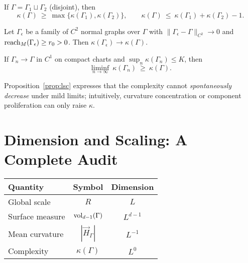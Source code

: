\begin{proposition}
\label{prop:mono}
If $\Gamma=\Gamma_1\sqcup\Gamma_2$ (disjoint), then
\[
\kappa(\Gamma)\ \ge\ \max\{\kappa(\Gamma_1),\kappa(\Gamma_2)\},\qquad
\kappa(\Gamma)\ \le\ \kappa(\Gamma_1)+\kappa(\Gamma_2)-1.
\]
\end{proposition}

\begin{proposition}
\label{prop:stability}
Let $\Gamma_\epsilon$ be a family of $C^2$ normal graphs over $\Gamma$ with $\|\Gamma_\epsilon-\Gamma\|_{C^2}\to 0$ and $\operatorname{reach}_M(\Gamma_\epsilon)\ge r_0>0$. Then $\kappa(\Gamma_\epsilon)\to \kappa(\Gamma)$.
\end{proposition}

\begin{proposition}
\label{prop:lsc}
If $\Gamma_n\to \Gamma$ in $C^1$ on compact charts and $\sup_n \kappa(\Gamma_n)\le K$, then
\[
\liminf_{n\to\infty}\ \kappa(\Gamma_n)\ \ge\ \kappa(\Gamma).
\]
\end{proposition}

\begin{remark}[Interpretation]
Proposition~\ref{prop:lsc} expresses that the complexity cannot \emph{spontaneously decrease} under mild limits; intuitively, curvature concentration or component proliferation can only raise $\kappa$.
\end{remark}

\bigskip

\section{Dimension and Scaling: A Complete Audit}
\label{sec:dim-audit}

\begin{center}
\renewcommand{\arraystretch}{1.12}
\begin{tabular}{|l|c|c|}
\hline
Quantity & Symbol & Dimension \\
\hline
Global scale & $R$ & $L$ \\
Surface measure & $\operatorname{vol}_{d-1}(\Gamma)$ & $L^{d-1}$ \\
Mean curvature & $|\vec H_\Gamma|$ & $L^{-1}$ \\
Complexity & $\kappa(\Gamma)$ & $L^0$ \\
\hline
\end{tabular}
\end{center}

